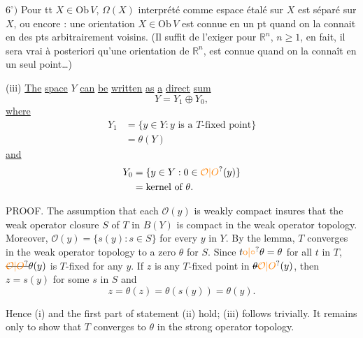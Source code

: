 $6^\circ)$ Pour tt $X\in\mathrm{Ob}\,V$, $\Omega(X)$ interprété comme espace étalé sur $X$ est séparé sur $X$, ou encore : une orientation  $X\in\mathrm{Ob}\,V$ est connue en un pt quand on la connait en des pts arbitrairement voisins. (Il suffit de l'exiger pour $\mathbb{R}^n$, $n\geq 1$, en fait, il sera vrai à posteriori qu'une orientation de $\mathbb{R}^n$,  est connue quand on la connaît en un seul point\ldots)


(iii) \uline{The} \uline{space} $Y$ \uline{can} \uline{be} \uline{written} \uline{as} \uline{a} \uline{direct} \uline{sum}
\[
Y=Y_1\oplus Y_0,
\]
\uline{where}
\[
\begin{aligned}
Y_1&=\{y\in Y:y\text{ is a }T\text{-fixed point}\}\\
&=\theta(Y)
\end{aligned}
\]
\uline{and}
\[
\begin{aligned}
Y_0&=\{y\in Y:0\in\unsure{\mathcal{O}|O}(y)\}\\
&=\text{kernel of }\theta.
\end{aligned}
\]

PROOF. The assumption that each $\mathcal{O}(y)$ is weakly compact insures that the weak operator closure $S$ of $T$ in $B(Y)$ is compact in the weak operator topology. Moreover, $\mathcal{O}(y)=\{s(y):s\in S\}$ for every $y$ in $Y$. By the lemma, $T$ converges in the weak operator topology to a zero $\theta$ for $S$. Since $t\unsure{\mathbin{\mathrm{o}}|\circ}\theta=\theta$ for all $t$ in $T$, $\deleted{\unsure{\mathcal{O}|O}}\handwritten{\theta}(y)$ is $T$-fixed for any $y$. If $z$ is any $T$-fixed point in $\deleted{\theta}\handwritten{\unsure{\mathcal{O}|O}}(y)$, then $z=s(y)$ for some $s$ in $S$ and
\[
z=\theta(z)=\theta(s(y))=\theta(y).
\]
\unsure{;|,}

Hence (i) and the first part of statement (ii) hold; (iii) follows trivially. It remains only to show that $T$ converges to $\theta$ in the strong operator topology.

